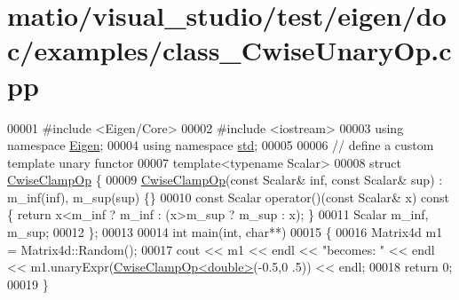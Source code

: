 \hypertarget{matio_2visual__studio_2test_2eigen_2doc_2examples_2class___cwise_unary_op_8cpp_source}{}\section{matio/visual\+\_\+studio/test/eigen/doc/examples/class\+\_\+\+Cwise\+Unary\+Op.cpp}
\label{matio_2visual__studio_2test_2eigen_2doc_2examples_2class___cwise_unary_op_8cpp_source}

\begin{DoxyCode}
00001 \textcolor{preprocessor}{#include <Eigen/Core>}
00002 \textcolor{preprocessor}{#include <iostream>}
00003 \textcolor{keyword}{using namespace }\hyperlink{namespace_eigen}{Eigen};
00004 \textcolor{keyword}{using namespace }\hyperlink{namespacestd}{std};
00005 
00006 \textcolor{comment}{// define a custom template unary functor}
00007 \textcolor{keyword}{template}<\textcolor{keyword}{typename} Scalar>
00008 \textcolor{keyword}{struct }\hyperlink{struct_cwise_clamp_op}{CwiseClampOp} \{
00009   \hyperlink{struct_cwise_clamp_op}{CwiseClampOp}(\textcolor{keyword}{const} Scalar& inf, \textcolor{keyword}{const} Scalar& sup) : m\_inf(inf), m\_sup(sup) \{\}
00010   \textcolor{keyword}{const} Scalar operator()(\textcolor{keyword}{const} Scalar& x)\textcolor{keyword}{ const }\{ \textcolor{keywordflow}{return} x<m\_inf ? m\_inf : (x>m\_sup ? m\_sup : x); \}
00011   Scalar m\_inf, m\_sup;
00012 \};
00013 
00014 \textcolor{keywordtype}{int} main(\textcolor{keywordtype}{int}, \textcolor{keywordtype}{char}**)
00015 \{
00016   Matrix4d m1 = Matrix4d::Random();
00017   cout << m1 << endl << \textcolor{stringliteral}{"becomes: "} << endl << m1.unaryExpr(\hyperlink{struct_cwise_clamp_op}{CwiseClampOp<double>}(-0.5,0
      .5)) << endl;
00018   \textcolor{keywordflow}{return} 0;
00019 \}
\end{DoxyCode}
